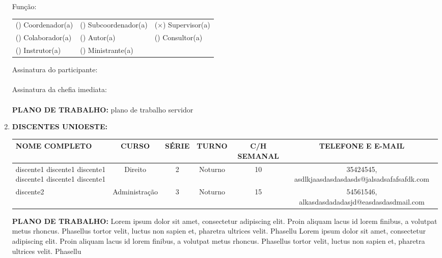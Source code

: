 \documentclass[12pt,a4paper,oneside]{article}%
\begin{document}
\begin{enumerate}
\begin{mdframed}[innertopmargin=5pt, innerleftmargin=3pt, innerrightmargin=3pt]
\begin{mdframed}[innertopmargin=5pt, innerleftmargin=3pt, innerrightmargin=3pt]
Função: %
\newline%
\begin{tabularx}{\linewidth}{XXX}%
() Coordenador(a)&() Subcoordenador(a)&($\times$) Supervisor(a)\\%
() Colaborador(a)&() Autor(a)&() Consultor(a)\\%
() Instrutor(a)&() Ministrante(a)&\\%
\end{tabularx}%
\end{mdframed}%
\linebreak%
Assinatura do participante: \hrulefill \\ \\%
Assinatura da chefia imediata: \hrulefill \\ \\%
\textbf{PLANO DE TRABALHO: }%
plano de trabalho servidor%
\end{mdframed}%
\item%
\textbf{DISCENTES UNIOESTE: }%
\newline%
{\scriptsize%
\begin{tabularx}{\linewidth}{|>{\centering\arraybackslash}X|
                              @{    }c@{    }|
                              @{    }c@{    }|
                              @{    }c@{    }|
                              @{    }c@{    }|
                              @{    }c@{    }|
                              }%
\hline%
NOME COMPLETO&CURSO&SÉRIE&TURNO&C/H SEMANAL&TELEFONE E E{-}MAIL\\%
\hline%
discente1 discente1 discente1 discente1 discente1 discente1&Direito&2&Noturno&10&35424545, 
\leavevmode\hspace{0pt}asdlkjaasdasdasdasds@jalsadsafafsafdk.com\\%
\hline%
discente2&Administração&3&Noturno&15&54561546, 
\leavevmode\hspace{0pt}alkasdasdadadasjd@easdasdasdmail.com\\%
\hline%
\end{tabularx}%
\linebreak%
\begin{mdframed}[innertopmargin=5pt, innerleftmargin=3pt, innerrightmargin=3pt, topline=false]%
\textbf{PLANO DE TRABALHO: }%
Lorem ipsum dolor sit amet, consectetur adipiscing elit. Proin aliquam lacus id lorem finibus, a volutpat metus rhoncus. Phasellus tortor velit, luctus non sapien et, pharetra ultrices velit. Phasellu%
\newline%
Lorem ipsum dolor sit amet, consectetur adipiscing elit. Proin aliquam lacus id lorem finibus, a volutpat metus rhoncus. Phasellus tortor velit, luctus non sapien et, pharetra ultrices velit. Phasellu%

\end{mdframed}}
\end{enumerate}
\end{document}
